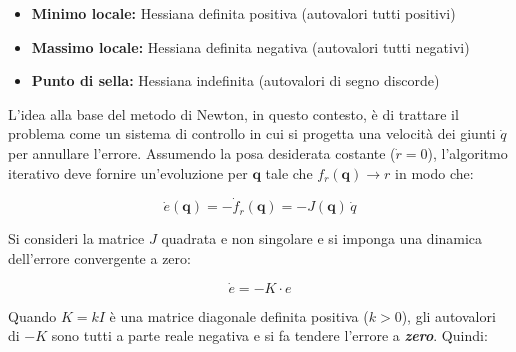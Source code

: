 \documentclass[11pt, a4paper]{article}
\begin{document}
\begin{itemize}
   \item{\begin{flushleft} \textbf{Minimo locale: }Hessiana definita positiva (autovalori tutti positivi) \end{flushleft}}
   \item{\begin{flushleft} \textbf{Massimo locale: }Hessiana definita negativa (autovalori tutti negativi) \end{flushleft}}
   \item{\begin{flushleft} \textbf{Punto di sella: }Hessiana indefinita (autovalori di segno discorde) \end{flushleft}}
\end{itemize}


\begin{par}
\begin{flushleft}
L'idea alla base del metodo di Newton, in questo contesto, è di trattare il problema come un sistema di controllo in cui si progetta una velocità dei giunti $\dot{q}$ per annullare l'errore. Assumendo la posa desiderata costante ($\dot{r} =0$), l'algoritmo iterativo deve fornire un'evoluzione per $\mathbf{q}$ tale che $f_r (\mathbf{q})\to r$ in modo che:
\end{flushleft}
\end{par}

\label{H_7088}
\[
    \dot{e}(\mathbf{q}) = -\dot{f}_r(\mathbf{q}) = -J(\mathbf{q})\,\dot{q}
\]

\begin{par}
\begin{flushleft}
Si consideri la matrice $J$ quadrata e non singolare e si imponga una dinamica dell'errore convergente a zero:
\end{flushleft}
\end{par}

\label{H_9ab9}
\[
    \dot{e} = -K \cdot e
\]

\begin{par}
\begin{flushleft}
Quando $K = k I$ è una matrice diagonale definita positiva ($k>0$), gli autovalori di $-K$ sono tutti a parte reale negativa e si fa tendere l'errore a \textit{\textbf{zero}}. Quindi:
\end{flushleft}
\end{par}
\end{document}
